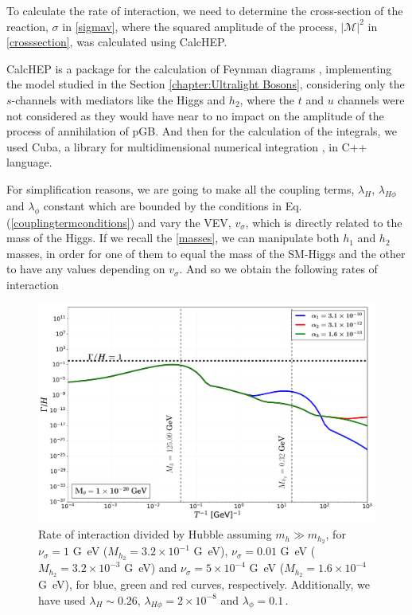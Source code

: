 To calculate the rate of interaction, we need to determine the cross-section of the reaction, $\sigma$ in \autoref{sigmav}, where the squared amplitude of the process, $|\mathcal{M}|^2$ in \autoref{crosssection}, was calculated using CalcHEP.

CalcHEP is a package for the calculation of Feynman diagrams \cite{Belyaev_2013}, implementing the model studied in the Section \autoref{chapter:Ultralight Bosons}, considering only the $s$-channels with mediators like the Higgs and $h_2$, where the $t$ and $u$ channels were not considered as they would have near to no impact on the amplitude of the process of annihilation of pGB.
And then for the calculation of the integrals, we used Cuba, a library for multidimensional numerical integration \cite{HAHN200578}, in C++ language.



For simplification reasons, we are going to make all the coupling terms, $\lambda_{H}$, $\lambda_{H\phi}$ and $\lambda_{\phi}$ constant which are bounded by the conditions in Eq.(\ref{couplingtermconditions}) and vary the VEV, $v_\sigma$, which is directly related to the mass of the Higgs.
If we recall the \autoref{masses}, we can manipulate both $h_1$ and $h_2$ masses, in order for one of them to equal the mass of the SM-Higgs and the other to have any values depending on $v_\sigma$.
And so we obtain the following rates of interaction 


\begin{figure}[H]
	\centering
	\includegraphics[width=0.7\linewidth]{graphs/ratedm_lesser}
	\caption{Rate of interaction divided by Hubble assuming $m_h \gg m_{h_2}$, for $\nu_\sigma=1$ \si{G\eV} ($M_{h_2} = 3.2\times10^{-1}$ \si{G\eV}),  $\nu_\sigma=0.01$ \si{G\eV} ($M_{h_2} = 3.2\times10^{-3}$ \si{G\eV}) and  $\nu_\sigma= 5\times10^{-4}$ \si{G\eV} ($M_{h_2} = 1.6\times10^{-4}$ \si{G\eV}), for blue, green and red curves, respectively.  Additionally, we have used $\lambda_H\sim0.26$, $\lambda_{H\phi}=2\times10^{-8}$ and $\lambda_\phi=0.1$\,.}
	\label{fig:ratelesser}
\end{figure}

